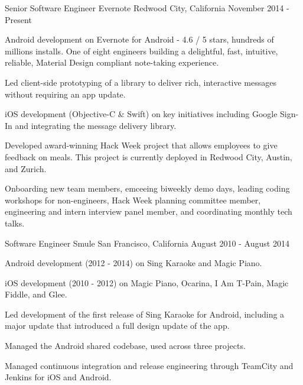 

\begin{cventries}

  \cventry
    {Senior Software Engineer} %
    {Evernote} %
    {Redwood City, California} %
    {November 2014 - Present} %
    {
      \begin{cvitems} %
        \item {Android development on Evernote for Android - 4.6 / 5 stars, hundreds of millions installs. One of eight engineers building a delightful, fast, intuitive, reliable, Material Design compliant note-taking experience.}
        \item {Led client-side prototyping of a library to deliver rich, interactive messages without requiring an app update.}
        \item {iOS development (Objective-C \& Swift) on key initiatives including Google Sign-In and integrating the message delivery library.}
        \item {Developed award-winning Hack Week project that allows employees to give feedback on meals. This project is currently deployed in Redwood City, Austin, and Zurich.}
		\item {Onboarding new team members, emceeing biweekly demo days, leading coding workshops for non-engineers, Hack Week planning committee member, engineering and intern interview panel member, and coordinating monthly tech talks.}
      \end{cvitems}
    }
    
  \cventry
    {Software Engineer} %
    {Smule} %
    {San Francisco, California} %
    {August 2010 - August 2014} %
    {
      \begin{cvitems} %
        \item {Android development (2012 - 2014) on Sing Karaoke and Magic Piano.}
        \item {iOS development (2010 - 2012) on Magic Piano, Ocarina, I Am T-Pain, Magic Fiddle, and Glee.}
        \item {Led development of the first release of Sing Karaoke for Android, including a major update that introduced a full design update of the app.}
        \item {Managed the Android shared codebase, used across three projects.}
        \item {Managed continuous integration and release engineering through TeamCity and Jenkins for iOS and Android.}
      \end{cvitems}
    }
    

\end{cventries}

